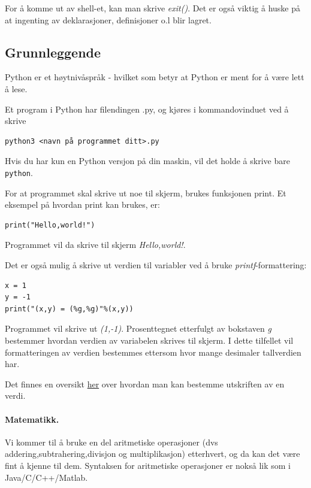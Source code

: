 \documentclass[%
oneside,                 %
final,                   %
10pt]{article}
\begin{document}
For å komme ut av shell-et, kan man skrive \emph{exit()}. Det er også viktig å huske på at ingenting av deklarasjoner, definisjoner o.l blir lagret.

\subsection{Grunnleggende}
Python er et høytnivåspråk - hvilket som betyr at Python er ment for å være lett å lese.

Et program i Python har filendingen .py, og kjøres i kommandovinduet ved å skrive 
\begin{verbatim}
python3 <navn på programmet ditt>.py
\end{verbatim}
Hvis du har kun en Python versjon på din maskin, vil det holde å skrive bare \texttt{python}. 

For at programmet skal skrive ut noe til skjerm, brukes funksjonen print.
Et eksempel på hvordan print kan brukes, er:

\begin{verbatim}
print("Hello,world!")
\end{verbatim}

Programmet vil da skrive til skjerm \emph{Hello,world!}.

Det er også mulig å skrive ut verdien til variabler ved å bruke \emph{printf}-formattering:

\begin{verbatim}
x = 1
y = -1
print("(x,y) = (%g,%g)"%(x,y))
\end{verbatim}

Programmet vil skrive ut \emph{(1,-1)}. Prosenttegnet etterfulgt av bokstaven \emph{g} bestemmer hvordan verdien av variabelen skrives til skjerm.
I dette tilfellet vil formatteringen av verdien bestemmes ettersom hvor mange desimaler tallverdien har.

Det finnes en oversikt \href{{https://docs.python.org/2/library/stdtypes.html#string-formatting}}{her} over hvordan man kan bestemme utskriften av en verdi.


\paragraph{Matematikk.}
Vi kommer til å bruke en del aritmetiske operasjoner (dvs addering,subtrahering,divisjon og multiplikasjon) etterhvert, og da kan det være fint å kjenne til dem.
Syntaksen for aritmetiske operasjoner er nokså lik som i Java/C/C++/Matlab.
\end{document}

